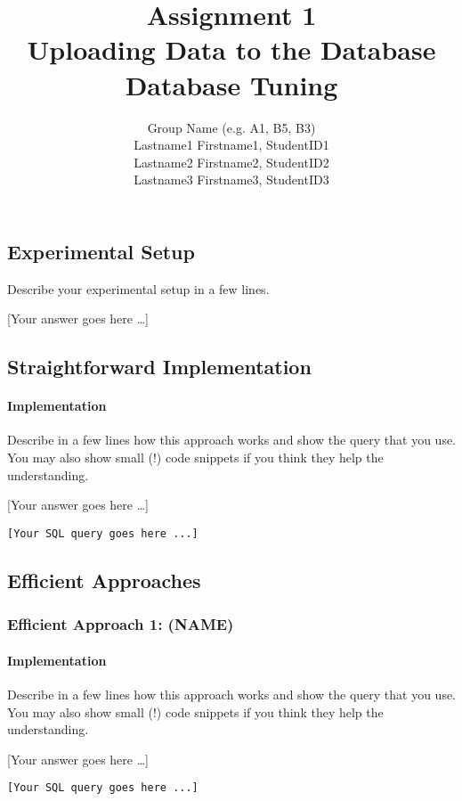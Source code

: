 \documentclass[11pt]{scrartcl}
\title{
  \textbf{\large Assignment 1} \\
  Uploading Data to the Database \\
  {\large Database Tuning}}
\author{
  Group Name (e.g. A1, B5, B3) \\
  \large Lastname1 Firstname1, StudentID1 \\
  \large Lastname2 Firstname2, StudentID2 \\
  \large Lastname3 Firstname3, StudentID3
}
\newcommand{\youranswerhere}{[Your answer goes here \ldots]}
\begin{document}
\maketitle

\subsection*{Experimental Setup}

Describe your experimental setup in a few lines.

\youranswerhere{}

\subsection*{Straightforward Implementation}

\paragraph{Implementation}

Describe in a few lines how this approach works and show the query that you use.
You may also show small (!) code snippets if you think they help the understanding.

\youranswerhere{}

\begin{lstlisting}[style=dbtsql]
[Your SQL query goes here ...]
\end{lstlisting}

\subsection*{Efficient Approaches}

\subsubsection*{Efficient Approach 1: (NAME)}

\paragraph{Implementation}

Describe in a few lines how this approach works and show the query that you use. You may also show small (!) code snippets if you think they help the understanding.

\youranswerhere{}

\begin{lstlisting}[style=dbtsql]
[Your SQL query goes here ...]
\end{lstlisting}
\end{document}
